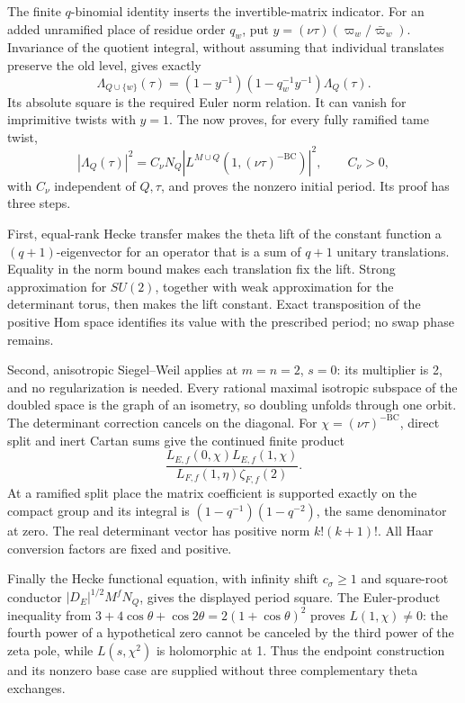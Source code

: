 The finite \(q\)-binomial identity inserts the invertible-matrix
indicator. For an added unramified place of residue order \(q_w\),
put \(y=(\nu\tau)(\varpi_w/\bar\varpi_w)\). Invariance of the
quotient integral, without assuming that individual translates
preserve the old level, gives exactly
\[
 \Lambda_{Q\cup\{w\}}(\tau)
   =(1-y^{-1})(1-q_w^{-1}y^{-1})\Lambda_Q(\tau).
\]
Its absolute square is the required Euler norm relation. It can
vanish for imprimitive twists with \(y=1\).
The  now proves, for every fully ramified tame twist,
\[
 |\Lambda_Q(\tau)|^2=C_\nu N_Q
       |L^{M\cup Q}(1,(\nu\tau)^{-\mathrm{BC}})|^2,
 \qquad C_\nu>0,
\]
with \(C_\nu\) independent of \(Q,\tau\), and proves the nonzero
initial period. Its proof has three steps.

First, equal-rank Hecke transfer makes the theta lift of the constant
function a \((q+1)\)-eigenvector for an operator that is a sum of
\(q+1\) unitary translations. Equality in the norm bound makes each
translation fix the lift. Strong approximation for \(SU(2)\), together
with weak approximation for the determinant torus, then makes the lift
constant. Exact transposition of the positive Hom space identifies its
value with the prescribed period; no swap phase remains.

Second, anisotropic Siegel--Weil applies at \(m=n=2\), \(s=0\):
its multiplier is 2, and no regularization is needed. Every rational
maximal isotropic subspace of the doubled space is the graph of an
isometry, so doubling unfolds through one orbit. The determinant
correction cancels on the diagonal. For
\(\chi=(\nu\tau)^{-\mathrm{BC}}\), direct split and inert Cartan sums
give the continued finite product
\[
 \frac{L_{E,f}(0,\chi)L_{E,f}(1,\chi)}
      {L_{F,f}(1,\eta)\zeta_{F,f}(2)}.
\]
At a ramified split place the matrix coefficient is supported exactly
on the compact group and its integral is
\((1-q^{-1})(1-q^{-2})\), the same denominator at zero.
The real determinant vector has positive norm \(k!(k+1)!\).
All Haar conversion factors are fixed and positive.

Finally the Hecke functional equation, with infinity shift
\(c_\sigma\ge1\) and square-root conductor
\(|D_E|^{1/2}M^fN_Q\), gives the displayed period square.
The Euler-product inequality from
\(3+4\cos\theta+\cos2\theta=2(1+\cos\theta)^2\)
proves \(L(1,\chi)\ne0\): the fourth power of a hypothetical zero
cannot be canceled by the third power of the zeta pole, while
\(L(s,\chi^2)\) is holomorphic at 1. Thus the endpoint construction
and its nonzero base case are supplied without three complementary
theta exchanges.

